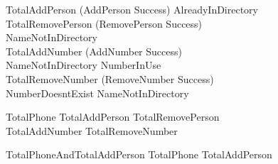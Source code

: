\documentclass{article}
\begin{document}
\begin{zed}
TotalAddPerson  (AddPerson \land Success) \lor AlreadyInDirectory \\
TotalRemovePerson  (RemovePerson \land Success) \\
 \lor NameNotInDirectory \\
TotalAddNumber  (AddNumber \land Success) \\
 \lor NameNotInDirectory \lor NumberInUse \\
TotalRemoveNumber  (RemoveNumber \land Success)  \\
\lor NumberDoesntExist \lor NameNotInDirectory \\
\end{zed}


\begin{zed}
TotalPhone  TotalAddPerson \lor TotalRemovePerson \\ \lor TotalAddNumber \lor TotalRemoveNumber
\end{zed}

\begin{zed}
TotalPhoneAndTotalAddPerson  TotalPhone \lor TotalAddPerson
\end{zed}
\end{document}
